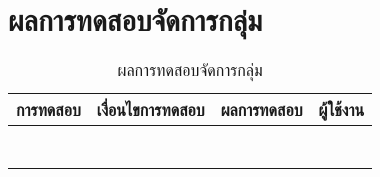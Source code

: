 \section{ผลการทดสอบจัดการกลุ่ม}
\begin{table}[H]
	\caption{ผลการทดสอบจัดการกลุ่ม}
    \centering	
	\label{tab:test27}
    \begin{tabular}{ | p{4cm} | p{4cm} | p{4cm} | p{2cm} | }
		\hline
	\multicolumn{1}{|c|}{การทดสอบ} & \multicolumn{1}{c|}{เงื่อนไขการทดสอบ} & \multicolumn{1}{c|}{ผลการทดสอบ} & \multicolumn{1}{c|}{ผู้ใช้งาน}                             \\ \hline
	\setstretch{1.0}{ทดสอบจัดการกลุ่ม}
	& \setstretch{1.0}{เจ้าของกลุ่มคลิกเลือกเพิ่มสมาชิกกลุ่ม}
	& \setstretch{1.0}{ระบบจะเพิ่มสมาชิกเข้ามาในกลุ่ม} 
	&\setstretch{1.0}{\begin{flushleft}ผู้ใช้งาน\end{flushleft}} \\ \cline{2-3} 
	& \setstretch{1.0}{เจ้าของกลุ่มเลือกลบสมาชิกกลุ่ม}
	& \setstretch{1.0}{ระบบจะลบสมาชิกเข้ามาในกลุ่ม } 
	&\setstretch{1.0}{}\\ \cline{2-3} 
	& \setstretch{1.0}{เจ้าของกลุ่มเลือกข้อมูลกลุ่ม}
	& \setstretch{1.0}{ระบบจะแสดงแยกระหว่างเจ้าของกลุ่ม และสมาชิกในกลุ่ม } 
	&\setstretch{1.0}{}\\ \cline{2-3} 
	& \setstretch{1.0}{เจ้าของกลุ่มเลือกลบกลุ่ม}
	& \setstretch{1.0}{ระบบลบสมาชิกทุกคนในกลุ่ม และลบกลุ่ม จากนั้นจะกลับไปหน้าแสดงกลุ่ม } 
	&\setstretch{1.0}{}\\ \cline{2-3} 
	& \setstretch{1.0}{สมาชิกในกลุ่มเลือกออกจากกลุ่ม}
	& \setstretch{1.0}{ระบบจะลบสมาชิกออกจากกลุ่ม } 
	&\setstretch{1.0}{}\\ \cline{2-3} 
	& \setstretch{1.0}{ผู้ใช้กรอกข้อความและกดส่งข้อความ}
	& \setstretch{1.0}{ระบบจะบันทึกข้อความและแสดงข้อความ } 
	&\setstretch{1.0}{}\\ \cline{2-3} 
	& \setstretch{1.0}{ผู้ใช้ไม่กรอกข้อความและกดส่งข้อความ}
	& \setstretch{1.0}{ระบบจะไม่บันทึกข้อความ และไม่แสดงข้อความ } 
	&\setstretch{1.0}{}\\ \cline{2-3} 
    \end{tabular}
\end{table}

